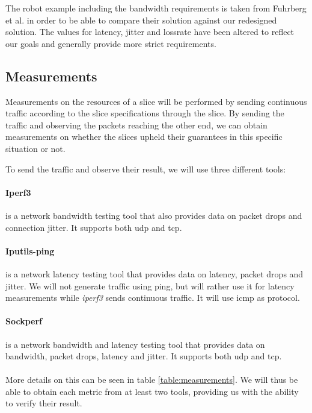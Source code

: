 The robot example including the \gls{bandwidth} requirements is taken from Fuhrberg et al. \cite{SE4} in order to be able to compare their solution against our redesigned solution. The values for \gls{latency}, \gls{jitter} and \gls{lossrate} have been altered to reflect our goals and generally provide more strict requirements.

\subsection{Measurements}
\label{measurements}
Measurements on the resources of a slice will be performed by sending continuous traffic according to the slice specifications through the slice. By sending the traffic and observing the packets reaching the other end, we can obtain measurements on whether the slices upheld their guarantees in this specific situation or not.

To send the traffic and observe their result, we will use three different tools:

\paragraph{Iperf3} \cite{iperf3} is a network \gls{bandwidth} testing tool that also provides data on packet drops and connection \gls{jitter}. It supports both \acrshort{udp} and \acrshort{tcp}.

\paragraph{Iputils-ping} \cite{iputils} is a network \gls{latency} testing tool that provides data on \gls{latency}, packet drops and \gls{jitter}. We will not generate traffic using ping, but will rather use it for \gls{latency} measurements while \textit{iperf3} sends continuous traffic. It will use \acrshort{icmp} as protocol.

\paragraph{Sockperf} \cite{sockperf} is a network \gls{bandwidth} and \gls{latency} testing tool that provides data on \gls{bandwidth}, packet drops, \gls{latency} and \gls{jitter}. It supports both \acrshort{udp} and \acrshort{tcp}.

\paragraph{} More details on this can be seen in table \ref{table:measurements}. We will thus be able to obtain each metric from at least two tools, providing us with the ability to verify their result.

